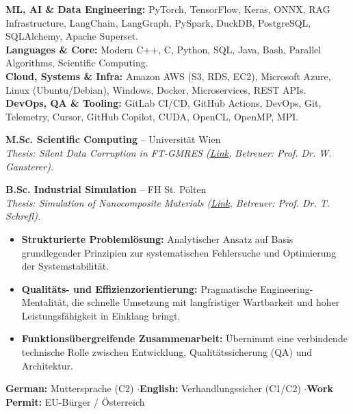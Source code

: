 \documentclass[10pt,a4paper]{article}
\begin{document}

\textbf{ML, AI \& Data Engineering:} PyTorch, TensorFlow, Keras, ONNX, RAG Infrastructure, LangChain, LangGraph, PySpark, DuckDB, PostgreSQL, SQLAlchemy, Apache Superset.\\[0.05em]
\textbf{Languages \& Core:} Modern C++, C, Python, SQL, Java, Bash, Parallel Algorithms, Scientific Computing.\\[0.05em]
\textbf{Cloud, Systems \& Infra:} Amazon AWS (S3, RDS, EC2), Microsoft Azure, Linux (Ubuntu/Debian), Windows, Docker, Microservices, REST APIs.\\[0.05em]
\textbf{DevOps, QA \& Tooling:} GitLab CI/CD, GitHub Actions, DevOps, Git, Telemetry, Cursor, GitHub Copilot, CUDA, OpenCL, OpenMP, MPI.


\textbf{M.Sc. Scientific Computing} -- Universität Wien \\
\textit{Thesis: Silent Data Corruption in FT-GMRES (\href{https://utheses.univie.ac.at/detail/40917/}{Link}, Betreuer: Prof. Dr. W. Gansterer).}

\vspace{0.1cm}
\textbf{B.Sc. Industrial Simulation} -- FH St. Pölten \\
\textit{Thesis: Simulation of Nanocomposite Materials (\href{\meinGithub/thesis/blob/master/Bakkarbeit_final.pdf}{Link}, Betreuer: Prof. Dr. T. Schrefl).}

\newcommand{\engineeringApproachde}{%
\cvsection{Technischer Ansatz & Arbeitsweise}%
\begin{itemize}[leftmargin=*, itemsep=2pt]%
\item \textbf{Strukturierte Problemlösung:} Analytischer Ansatz auf Basis grundlegender Prinzipien zur systematischen Fehlersuche und Optimierung der Systemstabilität.%
\item \textbf{Qualitäts- und Effizienzorientierung:} Pragmatische Engineering-Mentalität, die schnelle Umsetzung mit langfristiger Wartbarkeit und hoher Leistungsfähigkeit in Einklang bringt.%
\item \textbf{Funktionsübergreifende Zusammenarbeit:} Übernimmt eine verbindende technische Rolle zwischen Entwicklung, Qualitätssicherung (QA) und Architektur.%
\end{itemize}%
}

\engineeringApproachde


\textbf{German:} Muttersprache (C2) \quad$\cdot$\quad \textbf{English:} Verhandlungssicher (C1/C2) \quad$\cdot$\quad \textbf{Work Permit:} EU-Bürger / Österreich
\end{document}
